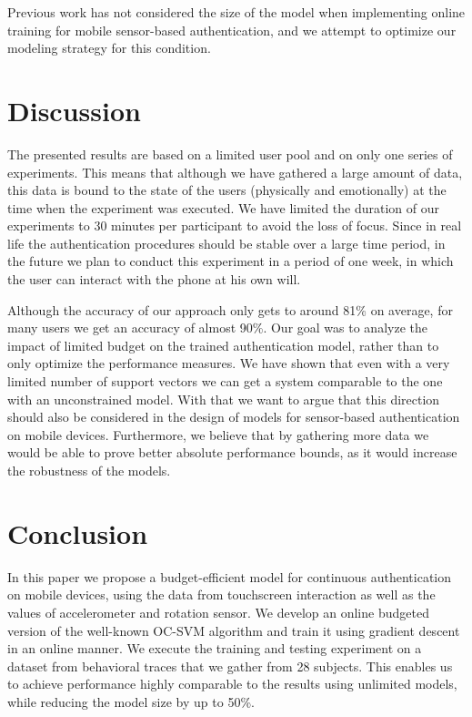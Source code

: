 \documentclass{llncs}
\begin{document}
Previous work has not considered the size of the model when implementing online training for mobile sensor-based authentication, and we attempt to optimize our modeling strategy for this condition.

\section{Discussion}
The presented results are based on a limited user pool and on only one series of experiments. This means that although we have gathered a large amount of data, this data is bound to the state of the users (physically and emotionally) at the time when the experiment was executed. We have limited the duration of our experiments to 30 minutes per participant to avoid the loss of focus. Since in real life the authentication procedures should be stable over a large time period, in the future we plan to conduct this experiment in a period of one week, in which the user can interact with the phone at his own will.

Although the accuracy of our approach only gets to around 81\% on average, for many users we get an accuracy of almost 90\%. Our goal was to analyze the impact of limited budget on the trained authentication model, rather than to only optimize the performance measures. We have shown that even with a very limited number of support vectors we can get a system comparable to the one with an unconstrained model. With that we want to argue that this direction should also be considered in the design of models for sensor-based authentication on mobile devices. Furthermore, we believe that by gathering more data we would be able to prove better absolute performance bounds, as it would increase the robustness of the models.

\section{Conclusion}

In this paper we propose a budget-efficient model for continuous authentication on mobile devices, using the data from touchscreen interaction as well as the values of accelerometer and rotation sensor. We develop an online budgeted version of the well-known OC-SVM algorithm and train it using gradient descent in an online manner. We execute the training and testing experiment on a dataset from behavioral traces that we gather from 28 subjects. This enables us to achieve performance highly comparable to the results using unlimited models, while reducing the model size by up to 50\%.
\end{document}
